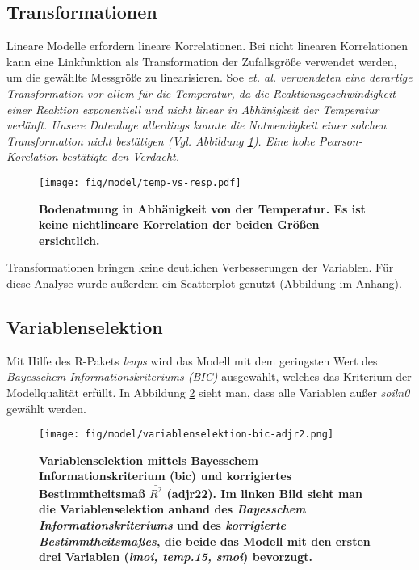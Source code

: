 \subsection{Transformationen}

Lineare Modelle erfordern lineare Korrelationen.
Bei nicht linearen Korrelationen kann eine Linkfunktion als Transformation der Zufallsgröße verwendet werden, um die gewählte Messgröße zu linearisieren.
Soe \it{et. al.} verwendeten eine derartige Transformation vor allem für die Temperatur, da die Reaktionsgeschwindigkeit einer Reaktion exponentiell und nicht linear in Abhänigkeit der Temperatur verläuft.
Unsere Datenlage allerdings konnte die Notwendigkeit einer solchen Transformation nicht bestätigen (Vgl. Abbildung \ref{fig:temp}).
Eine hohe \it{Pearson}-Korelation bestätigte den Verdacht.
\begin{figure}
	\centering
	\texttt{[image: fig/model/temp-vs-resp.pdf]}
	\caption{\bf{Bodenatmung in Abhänigkeit von der Temperatur.}
		 Es ist keine nichtlineare Korrelation der beiden Größen ersichtlich. }
	\label{fig:temp}
\end{figure}
Transformationen bringen keine deutlichen Verbesserungen der Variablen. 
Für diese Analyse wurde außerdem ein Scatterplot genutzt (Abbildung im Anhang).


\subsection{Variablenselektion}

Mit Hilfe des R-Pakets \emph{leaps} wird das Modell mit dem geringsten Wert des \emph{Bayesschem Informationskriteriums (BIC)} ausgewählt, welches das Kriterium der Modellqualität erfüllt.
In Abbildung \ref{fig:bic} sieht man, dass alle Variablen außer \emph{soiln0} gewählt werden. 



\begin{figure}[ht]
	\centering
	\texttt{[image: fig/model/variablenselektion-bic-adjr2.png]}
	\caption{\bf{Variablenselektion mittels Bayesschem Informationskriterium (bic) und korrigiertes Bestimmtheitsmaß $\bar{R^2}$ (adjr22)}. Im linken Bild sieht man die Variablenselektion anhand des \emph{Bayesschem Informationskriteriums} und des \emph{korrigierte Bestimmtheitsmaßes}, die beide das Modell mit den ersten drei Variablen (\emph{lmoi, temp.15, smoi}) bevorzugt.}
    \label{fig:bic}
\end{figure}

